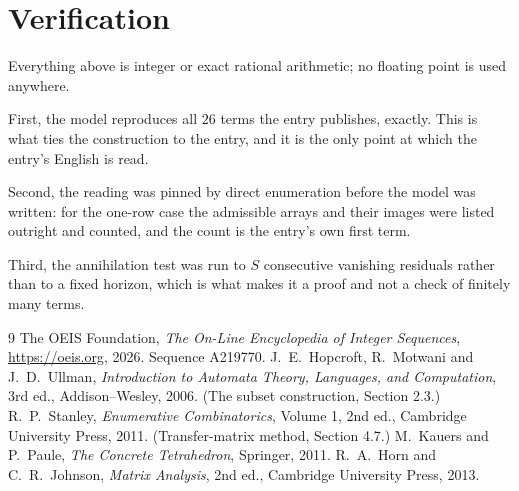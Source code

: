 \documentclass[11pt,a4paper]{article}
\theoremstyle{plain}
\theoremstyle{definition}
\begin{document}
\section{Verification}

Everything above is integer or exact rational arithmetic; no floating point is used anywhere.

First, the model reproduces all $26$ terms the entry publishes, exactly. This is what
ties the construction to the entry, and it is the only point at which the entry's English is
read.

Second, the reading was pinned by direct enumeration before the model was written: for the
one-row case the admissible arrays and their images were listed outright and counted, and the
count is the entry's own first term.

Third, the annihilation test was run to $S$ consecutive vanishing residuals rather than to a
fixed horizon, which is what makes it a proof and not a check of finitely many terms.

\begin{thebibliography}{9}
 The OEIS Foundation, \emph{The On-Line Encyclopedia of Integer
Sequences}, \url{https://oeis.org}, 2026. Sequence A219770.
 J.~E.~Hopcroft, R.~Motwani and J.~D.~Ullman, \emph{Introduction to Automata
Theory, Languages, and Computation}, 3rd ed., Addison--Wesley, 2006. (The subset
construction, Section 2.3.)
 R.~P.~Stanley, \emph{Enumerative Combinatorics}, Volume 1, 2nd ed.,
Cambridge University Press, 2011. (Transfer-matrix method, Section 4.7.)
 M.~Kauers and P.~Paule, \emph{The Concrete Tetrahedron}, Springer, 2011.
 R.~A.~Horn and C.~R.~Johnson, \emph{Matrix Analysis}, 2nd ed., Cambridge
University Press, 2013.
\end{thebibliography}
\end{document}
